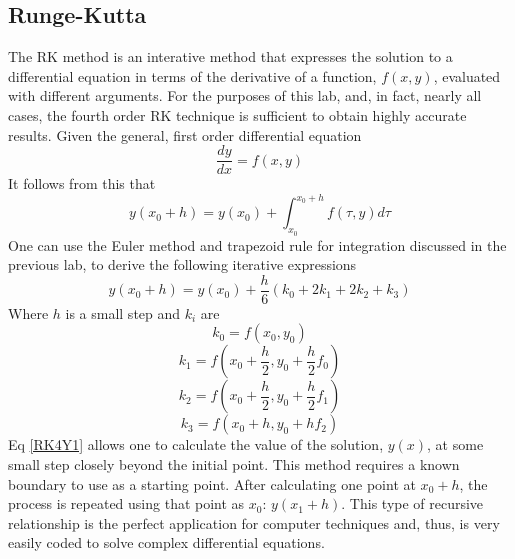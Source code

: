 \documentclass[12pt]{article}
\begin{document}
\subsection{Runge-Kutta}
The RK method is an interative method that expresses the solution to a differential equation in terms of the derivative of a function, $f(x,y)$, evaluated with different arguments.  For the purposes of this lab, and, in fact, nearly all cases, the fourth order RK technique is sufficient to obtain highly accurate results.  Given the general, first order differential equation
\begin{equation}
\label{diff1}
\frac{dy}{dx} = f(x,y)
\end{equation}
It follows from this that
\begin{equation}
\label{RK4int}
y(x_0+h)=y(x_0) + \int_{x_0}^{x_0+h}f(\tau,y) d\tau
\end{equation}
One can use the Euler method and trapezoid rule for integration discussed in the previous lab, to derive the following iterative expressions
\begin{equation}
\label{RK4Y1}
y(x_0+h) = y(x_0) + \frac{h}{6}(k_0 + 2 k_1 + 2 k_2 + k_3)
\end{equation}
Where $h$ is a small step and $k_i$ are 
\begin{equation}
\label{k10}
k_0 = f(x_0,y_0)
\end{equation}
\begin{equation}
\label{k11}
k_1 = f(x_0+\frac{h}{2},y_0+\frac{h}{2}f_0)
\end{equation}
\begin{equation}
\label{k12}
k_2 = f(x_0+\frac{h}{2},y_0+\frac{h}{2}f_1)
\end{equation}
\begin{equation}
\label{k13}
k_3 = f(x_0+h,y_0+h f_2)
\end{equation}
Eq \eqref{RK4Y1} allows one to calculate the value of the solution, $y(x)$, at some small step closely beyond the initial point.  This method requires a known boundary to use as a starting point.  After calculating one point at $x_0 + h$, the process is repeated using that point as $x_0$:  $y(x_1+h)$.  This type of recursive relationship is the perfect application for computer techniques and, thus, is very easily coded to solve complex differential equations.
\end{document}
